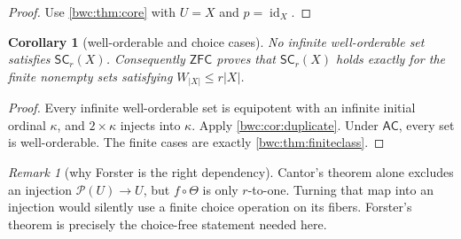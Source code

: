 \documentclass[11pt,letterpaper]{article}
\numberwithin{equation}{section}
\theoremstyle{plain}
\newtheorem{corollary}[corollary]{Corollary}
\theoremstyle{definition}
\theoremstyle{remark}
\newtheorem{remark}[remark]{Remark}
\newcommand{\Pow}{\mathcal P}
\newcommand{\SC}{\mathsf{SC}}
\newcommand{\ZFC}{\mathsf{ZFC}}
\newcommand{\AC}{\mathsf{AC}}
\begin{document}
\begin{proof}
Use \cref{bwc:thm:core} with $U=X$ and $p=\operatorname{id}_X$.
\end{proof}

\begin{corollary}[well-orderable and choice cases]\label{bwc:cor:choice}
No infinite well-orderable set satisfies $\SC_r(X)$.  Consequently $\ZFC$
proves that $\SC_r(X)$ holds exactly for the finite nonempty sets satisfying
$W_{|X|}\leq r|X|$.
\end{corollary}

\begin{proof}
Every infinite well-orderable set is equipotent with an infinite initial
ordinal $\kappa$, and $2\times\kappa$ injects into $\kappa$.  Apply
\cref{bwc:cor:duplicate}.  Under $\AC$, every set is well-orderable.  The finite
cases are exactly \cref{bwc:thm:finiteclass}.
\end{proof}

\begin{remark}[why Forster is the right dependency]
Cantor's theorem alone excludes an injection $\Pow(U)\to U$, but
$f\circ\Theta$ is only $r$-to-one.  Turning that map into an injection would
silently use a finite choice operation on its fibers.  Forster's theorem is
precisely the choice-free statement needed here.
\end{remark}
\end{document}
